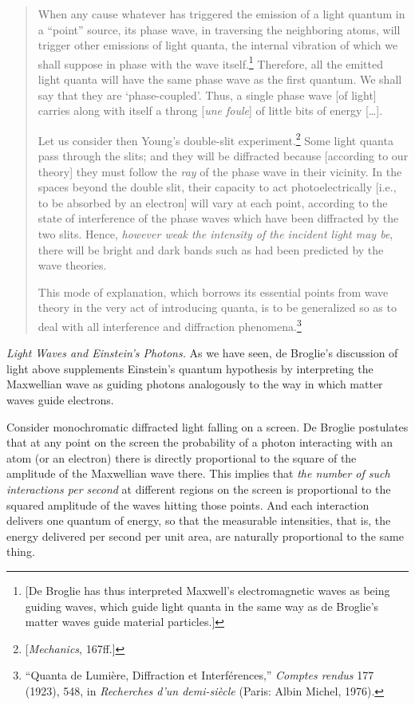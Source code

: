 \begin{quotation}
When any cause whatever has triggered the emission of a light quantum in
a ``point'' source, its phase wave, in traversing the neighboring atoms,
will trigger other emissions of light quanta, the internal vibration of
which we shall suppose in phase with the wave itself.\footnote{{[}De
  Broglie has thus interpreted Maxwell's electromagnetic waves as being
  guiding waves, which guide light quanta in the same way as de
  Broglie's matter waves guide material particles.{]}} Therefore, all
the emitted light quanta will have the same phase wave as the first
quantum. We shall say that they are `phase-coupled'. Thus, a single
phase wave {[}of light{]} carries along with itself a throng
{[}\emph{une foule}{]} of little bits of energy [\ldots].

Let us consider then Young's double-slit experiment.\footnote{{[}\emph{Mechanics},
  167ff.{]}} Some light quanta pass through the slits; and they will be
diffracted because {[}according to our theory{]} they must follow the
\emph{ray} of the phase wave in their vicinity. In the spaces beyond the
double slit, their capacity to act photoelectrically {[}i.e., to be
absorbed by an electron{]} will vary at each point, according to the
state of interference of the phase waves which have been diffracted by
the two slits. Hence, \emph{however weak the intensity of the incident
light may be}, there will be bright and dark bands such as had been
predicted by the wave theories.

This mode of explanation, which borrows its essential points from wave
theory in the very act of introducing quanta, is to be generalized so as
to deal with all interference and diffraction phenomena.\footnote{``Quanta
  de Lumière, Diffraction et Interférences,'' \emph{Comptes rendus} 177
  (1923), 548, in \emph{Recherches d'un demi-siècle} (Paris: Albin
  Michel, 1976).}
\end{quotation}

\emph{Light Waves and Einstein's Photons.} As we have seen, de
Broglie's discussion of light above supplements Einstein's quantum
hypothesis by interpreting the Maxwellian wave as guiding photons
analogously to the way in which matter waves guide electrons.

Consider monochromatic diffracted light falling on a screen. De Broglie
postulates that at any point on the screen the probability of a photon
interacting with an atom (or an electron) there is directly proportional
to the square of the amplitude of the Maxwellian wave there. This
implies that \emph{the number of such interactions per second} at
different regions on the screen is proportional to the squared amplitude
of the waves hitting those points. And each interaction delivers one
quantum of energy, so that the measurable intensities, that is, the
energy delivered per second per unit area, are naturally proportional to
the same thing.

